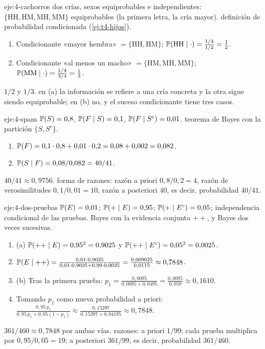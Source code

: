 \begin{solucion}{eje:4-cachorros}
\datos dos crías, sexos equiprobables e independientes: $\{\mathrm{HH},\mathrm{HM},\mathrm{MH},\mathrm{MM}\}$ equiprobables (la primera letra, la cría mayor).
\planteamiento definición de probabilidad condicionada (\cref{ej:t4-hijos}).
\pasos
\begin{enumerate}[label=(\alph*)]
  \item Condicionante «mayor hembra» $=\{\mathrm{HH},\mathrm{HM}\}$; $\mathbb{P}(\mathrm{HH}\mid\cdot)=\frac{1/4}{1/2}=\frac12$.
  \item Condicionante «al menos un macho» $=\{\mathrm{HM},\mathrm{MH},\mathrm{MM}\}$; $\mathbb{P}(\mathrm{MM}\mid\cdot)=\frac{1/4}{3/4}=\frac13$.
\end{enumerate}
\resultado $1/2$ y $1/3$.
\comprobacion en (a) la información se refiere a una cría concreta y la otra sigue siendo equiprobable; en (b) no, y el suceso condicionante tiene tres casos.
\end{solucion}

\begin{solucion}{eje:4-spam}
\datos $\mathbb{P}(S)=0{,}8$, $\mathbb{P}(F\mid S)=0{,}1$, $\mathbb{P}(F\mid S^{c})=0{,}01$.
\planteamiento teorema de Bayes con la partición $\{S,S^{c}\}$.
\pasos
\begin{enumerate}[label=\arabic*.]
  \item $\mathbb{P}(F)=0{,}1\cdot0{,}8+0{,}01\cdot0{,}2=0{,}08+0{,}002=0{,}082$.
  \item $\mathbb{P}(S\mid F)=0{,}08/0{,}082=40/41$.
\end{enumerate}
\resultado $40/41\approx0{,}9756$.
\comprobacion forma de razones: razón a priori $0{,}8/0{,}2=4$, razón de verosimilitudes $0{,}1/0{,}01=10$, razón a posteriori $40$, es decir, probabilidad $40/41$.
\end{solucion}

\begin{solucion}{eje:4-dos-pruebas}
\datos $\mathbb{P}(E)=0{,}01$; $\mathbb{P}(+\mid E)=0{,}95$; $\mathbb{P}(+\mid E^{c})=0{,}05$; independencia condicional de las pruebas.
\planteamiento Bayes con la evidencia conjunta $++$, y Bayes dos veces sucesivas.
\pasos
\begin{enumerate}[label=\arabic*.]
  \item (a) $\mathbb{P}(++\mid E)=0{,}95^{2}=0{,}9025$ y $\mathbb{P}(++\mid E^{c})=0{,}05^{2}=0{,}0025$.
  \item $\mathbb{P}(E\mid++)=\frac{0{,}01\cdot0{,}9025}{0{,}01\cdot0{,}9025+0{,}99\cdot0{,}0025}=\frac{0{,}009025}{0{,}0115}\approx0{,}7848$.
  \item (b) Tras la primera prueba: $p_1=\frac{0{,}0095}{0{,}0095+0{,}0495}=\frac{0{,}0095}{0{,}059}\approx0{,}1610$.
  \item Tomando $p_1$ como nueva probabilidad a priori: $\frac{0{,}95\,p_1}{0{,}95\,p_1+0{,}05(1-p_1)}\approx\frac{0{,}15297}{0{,}15297+0{,}04195}\approx0{,}7848$.
\end{enumerate}
\resultado $361/460\approx0{,}7848$ por ambas vías.
\comprobacion razones: a priori $1/99$; cada prueba multiplica por $0{,}95/0{,}05=19$; a posteriori $361/99$, es decir, probabilidad $361/460$.
\end{solucion}

